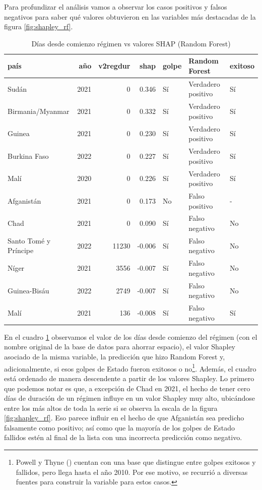 \documentclass{article}
\begin{document}
Para profundizar el análisis vamos a observar los casos positivos y falsos negativos para
saber qué valores obtuvieron en las variables más destacadas de la figura \ref{fig:shapley_rf}.

\begin{table}[H]
 \centering

 \begin{tabular}{lrrrlll}
  \toprule
  país & año & v2regdur & shap & golpe & Random Forest & exitoso \\
  \midrule
  Sudán & 2021 & 0 & 0.346 & Sí & Verdadero positivo & Sí \\
  Birmania/Myanmar & 2021 & 0 & 0.332 & Sí & Verdadero positivo & Sí \\
  Guinea & 2021 & 0 & 0.230 & Sí & Verdadero positivo & Sí \\
  Burkina Faso & 2022 & 0 & 0.227 & Sí & Verdadero positivo & Sí \\
  Malí & 2020 & 0 & 0.226 & Sí & Verdadero positivo & Sí \\
  Afganistán & 2021 & 0 & 0.173 & No & Falso positivo & - \\
  Chad & 2021 & 0 & 0.090 & Sí & Falso negativo & No \\
  Santo Tomé y Príncipe & 2022 & 11230 & -0.006 & Sí & Falso negativo & No \\
  Níger & 2021 & 3556 & -0.007 & Sí & Falso negativo & No \\
  Guinea-Bisáu & 2022 & 2749 & -0.007 & Sí & Falso negativo & No \\
  Malí & 2021 & 136 & -0.008 & Sí & Falso negativo & Sí \\
  \bottomrule
  \end{tabular} 
 \caption{Días desde comienzo régimen vs valores SHAP (Random Forest) \label{tab:shap_rf_regdur}}
\end{table}

En el cuadro \ref{tab:shap_rf_regdur} observamos el valor de los días desde comienzo del régimen
(con el nombre original de la base de datos para ahorrar espacio), el valor Shapley asociado de la 
misma variable, la predicción que hizo Random Forest y, adicionalmente, si esos golpes de Estado 
fueron exitosos o no\footnote{Powell y Thyne (\citeyear{Pow11}) 
cuentan con una base que distingue entre golpes exitosos y fallidos, pero llega hasta el año 2010. Por
ese motivo, se recurrió a diversas fuentes para construir la variable para estos casos.}. 
Además, el cuadro está ordenado de manera descendente a partir de los valores Shapley. Lo primero que 
podemos notar es que, a excepción de Chad en 2021, el hecho de tener cero días de duración de un 
régimen influye en un valor Shapley muy alto, ubicándose entre los más altos de toda la serie si se 
observa la escala de la figura \ref{fig:shapley_rf}. Eso parece influir en el hecho de que Afganistán 
sea predicho falsamente como positivo; así como que la mayoría de los golpes de Estado fallidos estén 
al final de la lista con una incorrecta predicción como negativo.
\end{document}
